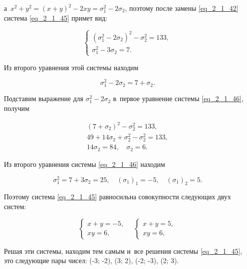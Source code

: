 \noindent
а~$x^{2} + y^{2} = (x + y)^{2} - 2xy = \sigma_{1}^{2} - 2\sigma_{2}$,
поэтому после замены \eqref{eq_2_1_42} система \eqref{eq_2_1_45} примет вид:

\begin{equation}\label{eq_2_1_46}
\begin{cases}
(\sigma_{1}^{2} - 2\sigma_{2})^{2} - \sigma_{2}^{2} = 133, \\
\sigma_{1}^{2} - 3\sigma_{2} = 7.
\end{cases}
\end{equation}

Из второго уравнения этой системы находим

\begin{equation*}
\sigma_{1}^{2} - 2\sigma_{2} = 7 + \sigma_{2}.
\end{equation*}

Подставим выражение для $\sigma_{1}^{2} - 2\sigma_{2}$ в~первое уравнение
системы \eqref{eq_2_1_46}, получим

\begin{gather*}
(7 + \sigma_{2})^{2} - \sigma_{2}^{2} = 133, \\
49 + 14\sigma_{2} + \sigma_{2}^{2} - \sigma_{2}^{2} = 133, \\
14\sigma_{2} = 84, \quad \sigma_{2} = 6.
\end{gather*}

Из второго уравнения системы \eqref{eq_2_1_46} находим

\begin{equation*}
\sigma_{1}^{2} = 7 + 3\sigma_{2} = 25,
\quad
(\sigma_{1})_{1} = -5,
\quad
(\sigma_{1})_{2} = 5.
\end{equation*}

Поэтому система \eqref{eq_2_1_45} равносильна совокупности следующих
двух систем:

\begin{equation*}
\begin{cases}
x + y = -5, \\
xy = 6,
\end{cases}
\quad
\begin{cases}
x + y = 5, \\
xy = 6,
\end{cases}
\end{equation*}

Решая эти системы, находим тем самым и~все решения системы \eqref{eq_2_1_45},
это следующие пары чисел:
(-3; -2), (3; 2), (-2; -3), (2; 3).

